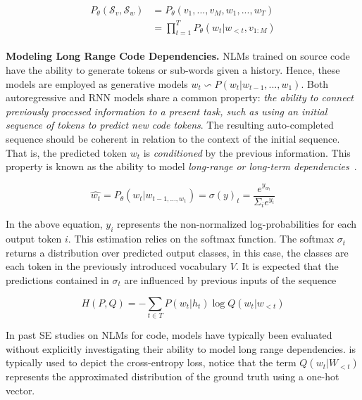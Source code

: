 \begin{align}
\begin{split}
P_{\theta}(\mathcal{S}_v,\mathcal{S}_w) & = P_{\theta}(v_1,...,v_M,w_1,...,w_T) \\
                        & = \prod_{t = 1}^{T} P_{\theta}(w_t | w_{<t}, v_{1:M} )
\end{split}
\label{eq:llmML}
\end{align}

\textbf{Modeling Long Range Code Dependencies.} NLMs trained on source code have the ability to generate tokens or sub-words given a history. Hence, these models are employed as generative models $w_t  \backsim P(w_t | w_{t-1},...,w_1 )$. Both autoregressive and RNN models share a common property: \textit{the ability to connect previously processed information to a present task, such as using an initial sequence of tokens to predict new code tokens}. The resulting auto-completed sequence should be coherent in relation to the context of the initial sequence. That is, the predicted token $w_t$ is \textit{conditioned} by the previous information. This property is known as the ability to model \textit{long-range or long-term dependencies}~\citep{karpathy2015understand}.

\begin{equation}
\hat{w_t} = P_{\theta}(w_t | w_{t-1,...,w_1} ) = \sigma(y)_t = \frac{e^{y_{w_t}}}{\Sigma_i e^{y_i}}
\label{eq:long}
\end{equation}

\noindent In the above equation, $y_i$ represents the non-normalized log-probabilities for each output token $i$. This estimation relies on the softmax function. The softmax $\sigma_t$ returns a distribution over predicted output classes, in this case, the classes are each token in the previously introduced vocabulary $V$. 
It is expected that the predictions contained in $\sigma_t$ are influenced by previous inputs of the sequence 

\begin{equation}
H(P,Q) = - \sum_{t \in T} P(w_t | h_t) \log Q(w_t | w_{<t})
\label{eq:cross}
\end{equation}

In past SE studies on NLMs for code, models have typically been evaluated without explicitly investigating their ability to model long range dependencies.  is typically used to depict the cross-entropy loss, notice that the term $Q(w_t| W_{<t})$ represents the approximated distribution of the ground truth using a one-hot vector.